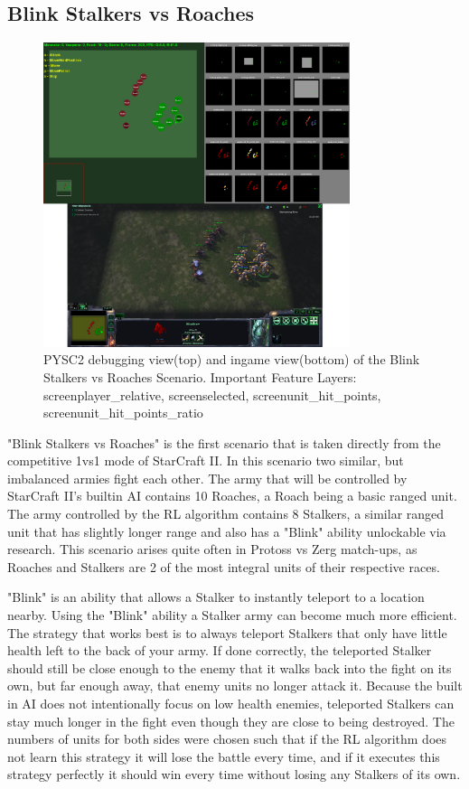\subsection{Blink Stalkers vs Roaches}
\begin{figure}[htb]
  \centering
      \includegraphics[width=0.8\textwidth]{Figures/StalkersRoaches.png}
  \caption{PYSC2 debugging view(top) and ingame view(bottom) of the Blink Stalkers vs Roaches Scenario. Important Feature Layers: screenplayer\_relative, screenselected, screenunit\_hit\_points, screenunit\_hit\_points\_ratio }
\end{figure}

"Blink Stalkers vs Roaches" is the first scenario that is taken directly from the competitive 1vs1 mode of StarCraft II. In this scenario two similar, but imbalanced armies fight each other. The army that will be controlled by StarCraft II's builtin AI contains 10 Roaches, a Roach being a basic ranged unit. The army controlled by the RL algorithm contains 8 Stalkers, a similar ranged unit that has slightly longer range and also has a "Blink" ability unlockable via research.
This scenario arises quite often in Protoss vs Zerg match-ups, as Roaches and Stalkers are 2 of the most integral units of their respective races.

"Blink" is an ability that allows a Stalker to instantly teleport to a location nearby. Using the "Blink" ability a Stalker army can become much more efficient. The strategy that works best is to always teleport Stalkers that only have little health left to the back of your army. If done correctly, the teleported Stalker should still be close enough to the enemy that it walks back into the fight on its own, but far enough away, that enemy units no longer attack it. Because the built in AI does not intentionally focus on low health enemies, teleported Stalkers can stay much longer in the fight even though they are close to being destroyed. The numbers of units for both sides were chosen such that if the RL algorithm does not learn this strategy it will lose the battle every time, and if it executes this strategy perfectly it should win every time without losing any Stalkers of its own.

